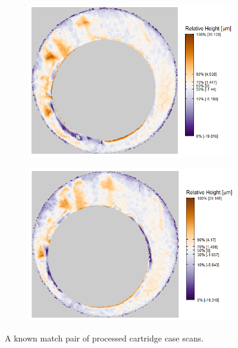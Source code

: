\begin{figure}[htbp]
\begin{subfigure}{\textwidth}
\centering
 \includegraphics[width=\textwidth]{./images/km1_processed_ggplot.png}
\end{subfigure}
\begin{subfigure}{\linewidth}
\centering
\includegraphics[width=\textwidth]{./images/km2_processed_ggplot.png}
\end{subfigure}
\caption{A known match pair of processed cartridge case scans.}
\label{fig:unprocessedScans}
\end{figure}

